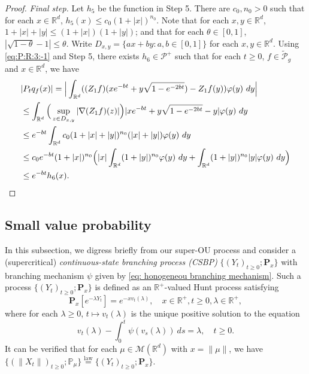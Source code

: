 \documentclass[12pt,a4paper]{amsart}
\theoremstyle{plain}
\theoremstyle{definition}
\numberwithin{equation}{section}
\begin{document}
\begin{proof}
\emph{Final step.}
Let $h_5$ be the function in Step 5. There are $c_0, n_0> 0$ such that for each $x\in \mathbb R^d$, $h_5(x) \leq c_0(1+|x|)^{n_0}$.
Note that for each $x, y \in \mathbb R^d$, $1+|x|+|y|\leq (1+|x|) (1+|y|)$;
and that for each $\theta \in [0,1]$, $|\sqrt {1 - \theta} - 1| \leq \theta$.
Write %
$D_{x,y} = \{ax+by: a, b \in [0,1]\}$ for each $x, y \in \mathbb R^d$.
Using \eqref{eq:P:R:3:-1} and Step 5,
  there exists  $h_6 \in \mathcal P^+$
such that for each $t \geq 0$, $f \in \widetilde {\mathcal P}_g$ and $x \in \mathbb R^d$, we have
  \begin{align}
    & |P_t q_f(x)|
      = \Big| \int_{\mathbb R^d} ( (Z_1f)(x e^{-bt}+ y \sqrt{1 - e^{-2bt}}) - Z_1 f (y) ) \varphi(y) ~dy \Big| \\
    & \leq \int_{\mathbb R^d} \Big(\sup_{z\in D_{x,y}} |\nabla  (Z_1f) (z) |\Big) | x e^{-bt} + y \sqrt{1 - e^{-2bt}} - y | \varphi(y) ~dy \\
    & \leq e^{-bt} \int_{\mathbb R^d} c_0(1+|x|+|y|)^{n_0} (|x|+|y|) \varphi(y) ~dy \\
    & \leq c_0 e^{-bt}(1+|x|)^{n_0}\Big(|x|\int_{\mathbb R^d} (1+|y|)^{n_0}\varphi(y) ~dy + \int_{\mathbb R^d} (1+ |y|)^{n_0} |y| \varphi(y) ~dy \Big) \\
    & \leq e^{-bt} h_6(x).
      \qedhere
  \end{align}
\end{proof}


\subsection{Small value probability}
\label{sec: Small value probability}
In this subsection, we digress briefly from our super-OU process and consider a (supercritical) \emph{continuous-state branching process (CSBP)} $\{(Y_t)_{t\geq 0}; \mathbf P_x\}$ with branching mechanism $\psi$ given by \eqref{eq: honogeneou branching mechanism}.
Such a process $\{(Y_t)_{t\geq 0}; \mathbf P_x\}$ is defined as an $\mathbb R^+$-valued Hunt process satisfying
\[
  \mathbf P_x[e^{-\lambda Y_t}] = e^{- x v_t(\lambda)},
  \quad x\in \mathbb R^+, t\geq 0, \lambda \in \mathbb R^+,
\]
where for each $\lambda\geq 0$, $t\mapsto v_t(\lambda)$ is the unique positive solution to the equation
\begin{equation}
  \label{eq: fkpp equation for CSBP}
  v_t(\lambda) - \int_0^t \psi(v_s(\lambda))~ds = \lambda,
  \quad t\geq 0.
\end{equation}
It can be verified that for each $\mu \in \mathcal M(\mathbb R^d)$ with $x = \| \mu \|$, we have
\(
  \{(\|X_t\|)_{t\geq 0}; \mathbb P_\mu\}
  \overset{\text{law}}{=} \{(Y_t)_{t\geq 0}; \mathbf P_x\}.
\)
\end{document}
